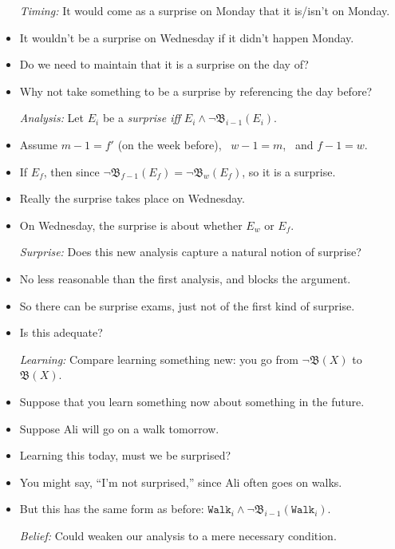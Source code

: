 \documentclass[a4paper, 11pt]{article} %
\newcommand{\B}{\mathfrak{B}}
\begin{document}
\begin{itemize}
  \item[\it Timing:] It would come as a surprise on Monday that it is/isn't on Monday.
    \item It wouldn't be a surprise on Wednesday if it didn't happen Monday.
    \item Do we need to maintain that it is a surprise on the day of?
    \item Why not take something to be a surprise by referencing the day before?
  \item[\it Analysis:] Let $E_i$ be a \textit{surprise iff} $E_i \wedge \neg \B_{i-1}(E_i)$.
    \item Assume $m-1 = f'$ (on the week before),~ $w-1=m$,~ and $f-1=w$. 
    \item If $E_f$, then since $\neg \B_{f-1}(E_f) = \neg \B_{w}(E_f)$, so it is a surprise.
    \item Really the surprise takes place on Wednesday.
    \item On Wednesday, the surprise is about whether $E_w$ or $E_f$. 
  \item[\it Surprise:] Does this new analysis capture a natural notion of surprise?
    \item No less reasonable than the first analysis, and blocks the argument.
    \item So there can be surprise exams, just not of the first kind of surprise.
    \item Is this adequate?
  \item[\it Learning:] Compare learning something new: you go from $\neg \B(X)$ to $\B(X)$.
    \item Suppose that you learn something now about something in the future.
    \item Suppose Ali will go on a walk tomorrow.
    \item Learning this today, must we be surprised?
    \item You might say, ``I'm not surprised,'' since Ali often goes on walks.
    \item But this has the same form as before: $\texttt{Walk}_i \wedge \neg \B_{i-1}(\texttt{Walk}_i)$.
  \item[\it Belief:] Could weaken our analysis to a mere necessary condition.

\end{itemize}
\end{document}
